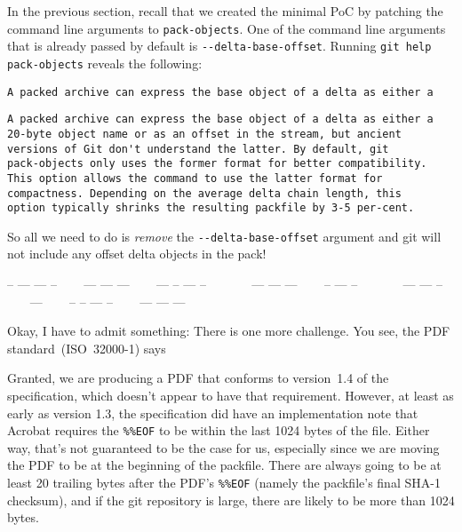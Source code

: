 \documentclass{article}
\def\thindivider{\centerline{\tiny%
-- --- --- -- ~~~ --- --- --- ~~~ --- -- --- -- ~~~~~~
--- --- --- ~~~  -- --- -- ~~~~~~
--- --- -- ~~~ --- ~~~ -- -- --- -- ~~~ --- --- ---}}
\begin{document}
In the previous section, recall that we created the minimal PoC by
patching the command line arguments to \texttt{pack-objects}.  One of
the command line arguments that is already passed by default
is \texttt{-{}-delta-base-offset}. Running \texttt{git help
pack-objects} reveals the following:
\begin{center}
{\footnotesize{}\hbox{\verb|A packed archive can express the base object of a delta as either a|}
\begin{minipage}{\wd9}
\begin{verbatim}
A packed archive can express the base object of a delta as either a
20-byte object name or as an offset in the stream, but ancient
versions of Git don't understand the latter. By default, git
pack-objects only uses the former format for better compatibility.
This option allows the command to use the latter format for
compactness. Depending on the average delta chain length, this
option typically shrinks the resulting packfile by 3-5 per-cent.
\end{verbatim}
\end{minipage}}
\end{center}
So all we need to do is \emph{remove} the \texttt{-{}-delta-base-offset}
argument and git will not include any offset delta objects in the
pack!

\thindivider

Okay, I have to admit something: There is one more challenge. You see,
the PDF standard~(ISO~32000-1) says
\begin{center}
\end{center}
Granted, we are producing a PDF that conforms to version~1.4 of the
specification, which doesn't appear to have that requirement.
However, at least as early as version 1.3, the specification did have
an implementation note that Acrobat requires the \texttt{\%\%EOF} to
be within the last 1024 bytes of the file.  Either way, that's not
guaranteed to be the case for us, especially since we are moving the
PDF to be at the beginning of the packfile.  There are always going to
be at least 20 trailing bytes after the PDF's \texttt{\%\%EOF} (namely
the packfile's final SHA-1 checksum), and if the git repository is
large, there are likely to be more than 1024 bytes.
\end{document}
